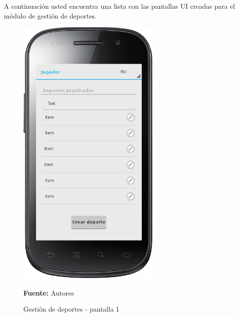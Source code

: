 A continuación usted encuentra una lista con las pantallas UI creadas para el módulo de gestión de deportes.

\begin{figure}[!htb]
  \begin{center}
    \includegraphics[width=7cm]{./imagenes/UI/Deportes/gestion_deportes_1.png}
    \caption{Gestión de deportes - pantalla 1}
    \label{fig:gestion_deportes_1}
    \textbf{Fuente:}  Autores
  \end{center}
\end{figure}

